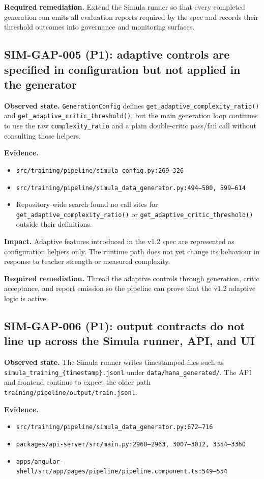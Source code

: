 \textbf{Required remediation.}
Extend the Simula runner so that every completed generation run emits
all evaluation reports required by the spec and records their
threshold outcomes into governance and monitoring surfaces.

\subsection*{SIM-GAP-005 (P1): adaptive controls are specified in configuration but not applied in the generator}
\textbf{Observed state.}
\texttt{GenerationConfig} defines
\texttt{get\_adaptive\_complexity\_ratio()} and
\texttt{get\_adaptive\_critic\_threshold()}, but the main generation
loop continues to use the raw \texttt{complexity\_ratio} and a plain
double-critic pass/fail call without consulting those helpers.

\textbf{Evidence.}
\begin{itemize}
  \item \texttt{src/training/pipeline/simula\_config.py:269--326}
  \item \texttt{src/training/pipeline/simula\_data\_generator.py:494--500, 599--614}
  \item Repository-wide search found no call sites for
    \texttt{get\_adaptive\_complexity\_ratio()} or
    \texttt{get\_adaptive\_critic\_threshold()} outside their
    definitions.
\end{itemize}

\textbf{Impact.}
Adaptive features introduced in the v1.2 spec are represented as
configuration helpers only. The runtime path does not yet change its
behaviour in response to teacher strength or measured complexity.

\textbf{Required remediation.}
Thread the adaptive controls through generation, critic acceptance,
and report emission so the pipeline can prove that the v1.2 adaptive
logic is active.

\subsection*{SIM-GAP-006 (P1): output contracts do not line up across the Simula runner, API, and UI}
\textbf{Observed state.}
The Simula runner writes timestamped files such as
\texttt{simula\_training\_\{timestamp\}.jsonl} under
\texttt{data/hana\_generated/}. The API and frontend continue to
expect the older path \texttt{training/pipeline/output/train.jsonl}.

\textbf{Evidence.}
\begin{itemize}
  \item \texttt{src/training/pipeline/simula\_data\_generator.py:672--716}
  \item \texttt{packages/api-server/src/main.py:2960--2963,
    3007--3012, 3354--3360}
  \item \texttt{apps/angular-shell/src/app/pages/pipeline/pipeline.component.ts:549--554}
\end{itemize}

